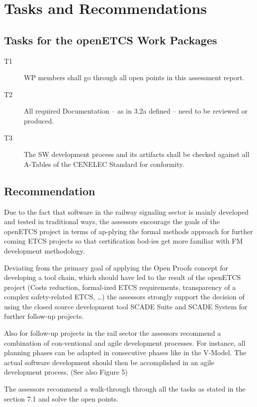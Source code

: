 \section{Tasks and Recommendations}

\subsection{Tasks for the openETCS Work Packages}
\bigskip

\begin{description}
\item[T1]	WP members shall go through all open points in this assessment report.
\item[T2]	All required Documentation – as in 3.2a defined – need to be reviewed or produced.
\item[T3]	The SW development process and its artifacts shall be checked against all A-Tables of the CENELEC Standard for conformity.
\end{description}

\subsection{Recommendation}

Due to the fact that software in the railway signaling sector is mainly developed and tested in traditional ways, the assessors encourage the goals of the openETCS project in terms of ap-plying the formal methods approach for further coming ETCS projects so that certification bod-ies get more familiar with FM development methodology.

Deviating from the primary goal of applying the Open Proofs concept for developing a tool chain, which should have led to the result of the openETCS project (Costs reduction, formal-ized ETCS requirements, transparency of a complex safety-related ETCS, …) the assessors strongly support the decision of using the closed source development tool SCADE Suite and SCADE System for further follow-up projects.

Also for follow-up projects in the rail sector the assessors recommend a combination of con-ventional and agile development processes. For instance, all planning phases can be adapted in consecutive phases like in the V-Model. The actual software development should then be accomplished in an agile development process. (See also Figure 5) 

The assessors recommend a walk-through through all the tasks as stated in the section 7.1 and solve the open points.